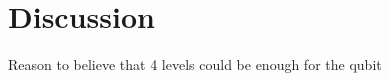 \documentclass[main.tex]{subfiles}
\begin{document}
\chapter{Discussion}





Reason to believe that 4 levels could be enough for the qubit
\end{document}
